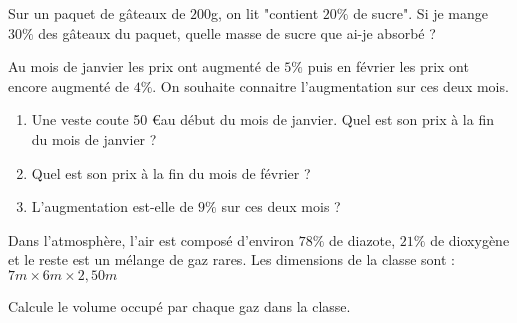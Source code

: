 \begin{pageParcourst}


Sur un paquet de gâteaux de $200$g, on lit "contient $20\%$ de sucre".  Si je mange $30\%$ des gâteaux du paquet, quelle masse de sucre que ai-je absorbé ?
 



Au mois de janvier les prix ont augmenté de $5\%$ puis en février les prix ont encore augmenté de $4\%$. On souhaite connaitre l'augmentation sur ces deux mois.
 
\begin{enumerate}[leftmargin=*]
\item Une veste coute 50 \euro au début du mois de janvier. Quel est son prix à la fin du mois de janvier ?  
\item Quel est son prix à la fin du mois de février ?  
\item L'augmentation est-elle de $9\%$ sur ces deux mois ?  
\end{enumerate}


Dans l'atmosphère, l'air est composé d'environ $78\%$ de diazote, $21\%$ de dioxygène et le reste est un mélange de gaz rares. Les dimensions de la classe sont : $7m \times 6m  \times 2,50m$

Calcule le volume occupé par chaque gaz dans la classe.



\end{pageParcourst}


\begin{pageBrouillon} 
 

\end{pageBrouillon}


